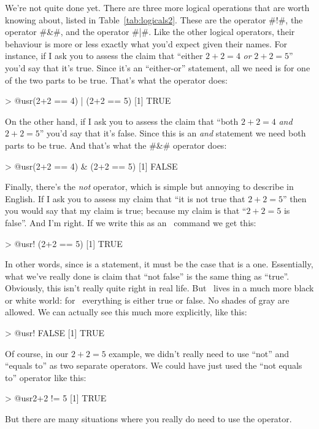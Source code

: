 We're not quite done yet. There are three more logical operations that are worth knowing about, listed in Table~\ref{tab:logicals2}. These are the  operator \rtextverb#!#, the  operator \rtextverb#&#, and the  operator \rtextverb#|#. Like the other logical operators, their behaviour is more or less exactly what you'd expect given their names. For instance, if I ask you to assess the claim that ``either $2+2 = 4$ {\it or} $2+2 = 5$'' you'd say that it's true. Since it's an ``either-or'' statement, all we need is for one of the two parts to be true. That's what the \rtext{|} operator does:
\begin{rblock1}
> @usr{(2+2 == 4) | (2+2 == 5)}
[1] TRUE
\end{rblock1}
On the other hand, if I ask you to assess the claim that ``both $2+2 = 4$ {\it and} $2+2 = 5$'' you'd say that it's false. Since this is an {\it and} statement we need both parts to be true. And that's what the \rtextverb#&# operator does:
\begin{rblock1}
> @usr{(2+2 == 4) & (2+2 == 5)}
[1] FALSE
\end{rblock1}
Finally, there's the {\it not} operator, which is simple but annoying to describe in English. If I ask you to assess my claim that ``it is not true that $2+2 = 5$'' then you would say that my claim is true; because my claim is that ``$2+2 = 5$ is false''. And I'm right. If we write this as an \R\ command we get this:  
\begin{rblock1}
> @usr{! (2+2 == 5)}
[1] TRUE
\end{rblock1}
In other words, since  is a  statement, it must be the case that  is a  one. Essentially, what we've really done is claim that ``not false'' is the same thing as ``true''. Obviously, this isn't really quite right in real life. But \R\ lives in a much more black or white world: for \R\ everything is either true or false. No shades of gray are allowed. We can actually see this much more explicitly, like this:
\begin{rblock1}
> @usr{! FALSE}
[1] TRUE
\end{rblock1}
Of course, in our $2+2 = 5$ example, we didn't really need to use ``not'' \rtext{!} and ``equals to'' \rtext{==} as two separate operators. We could have just used the ``not equals to'' operator \rtext{!=} like this:
\begin{rblock1}
> @usr{2+2 != 5}
[1] TRUE
\end{rblock1}
But there are many situations where you really do need to use the \rtext{!} operator. 
